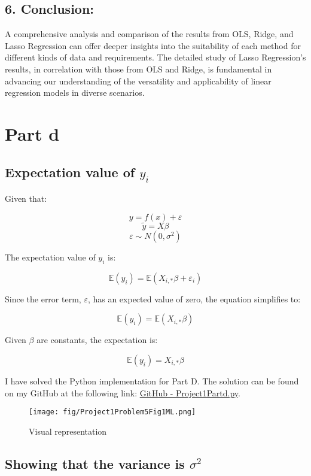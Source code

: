 \documentclass{article}
\begin{document}
\subsection*{6. Conclusion:}
A comprehensive analysis and comparison of the results from OLS, Ridge, and Lasso Regression can offer deeper insights into the suitability of each method for different kinds of data and requirements. The detailed study of Lasso Regression’s results, in correlation with those from OLS and Ridge, is fundamental in advancing our understanding of the versatility and applicability of linear regression models in diverse scenarios.


\section*{Part d}

\subsection*{Expectation value of \(y_i\)}

Given that:

\[ y = f(x) + \varepsilon \]
\[ \tilde{y} = X \beta \]
\[ \varepsilon \sim N(0, \sigma^2) \]

The expectation value of \(y_i\) is:

\[ \mathbb{E}(y_i) = \mathbb{E}(X_{i, *} \beta + \varepsilon_i) \]

Since the error term, \( \varepsilon \), has an expected value of zero, the equation simplifies to:

\[ \mathbb{E}(y_i) = \mathbb{E}(X_{i, *} \beta) \]

Given \( \beta \) are constants, the expectation is:

\[ \mathbb{E}(y_i) = X_{i, *} \beta \]

I have solved the Python implementation for Part D. The solution can be found on my GitHub at the following link: \href{https://github.com/SheikAbdullahi/MachineLearning/blob/main/Project1/Project1Partd.py}{GitHub - Project1Partd.py}.

\begin{figure}[htbp]
    \centering
    \texttt{[image: fig/Project1Problem5Fig1ML.png]}
    \caption{Visual representation}
    \label{fig:python-code}
\end{figure}

\subsection*{Showing that the variance is \( \sigma^2 \)}
\end{document}
